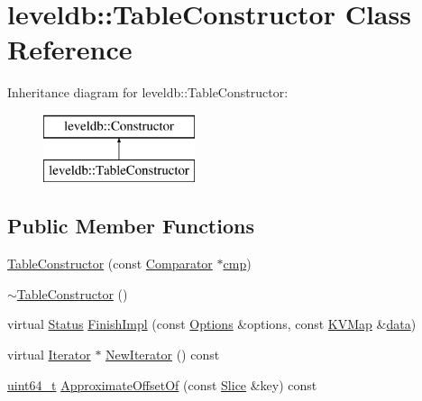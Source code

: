 \hypertarget{classleveldb_1_1_table_constructor}{}\section{leveldb\+:\+:Table\+Constructor Class Reference}
\label{classleveldb_1_1_table_constructor}
Inheritance diagram for leveldb\+:\+:Table\+Constructor\+:\begin{figure}[H]
\begin{center}
\leavevmode
\includegraphics[height=2.000000cm]{classleveldb_1_1_table_constructor}
\end{center}
\end{figure}
\subsection*{Public Member Functions}
\begin{DoxyCompactItemize}
\item 
\hyperlink{classleveldb_1_1_table_constructor_acfc791dc15a8fac77f9715fda659eb19}{Table\+Constructor} (const \hyperlink{structleveldb_1_1_comparator}{Comparator} $\ast$\hyperlink{table__test_8cc_a87863e435922f0910ca8db43f02a6c0b}{cmp})
\item 
\hyperlink{classleveldb_1_1_table_constructor_a4be60433281b7d5e6aa37688be8d1631}{$\sim$\+Table\+Constructor} ()
\item 
virtual \hyperlink{classleveldb_1_1_status}{Status} \hyperlink{classleveldb_1_1_table_constructor_aa8ce3799a55859c2dee50d3e08f56ef2}{Finish\+Impl} (const \hyperlink{structleveldb_1_1_options}{Options} \&options, const \hyperlink{namespaceleveldb_aac1e50450147be263e08252c6700f7a7}{K\+V\+Map} \&\hyperlink{classleveldb_1_1_constructor_a55a0363200d6e86d8beb3b15b75e3824}{data})
\item 
virtual \hyperlink{classleveldb_1_1_iterator}{Iterator} $\ast$ \hyperlink{classleveldb_1_1_table_constructor_a4897f3cb58fed2bd3a9f7f6468b6a105}{New\+Iterator} () const 
\item 
\hyperlink{stdint_8h_aaa5d1cd013383c889537491c3cfd9aad}{uint64\+\_\+t} \hyperlink{classleveldb_1_1_table_constructor_a798ee199e8fdc5ec020725dba32a4cb6}{Approximate\+Offset\+Of} (const \hyperlink{classleveldb_1_1_slice}{Slice} \&key) const 
\end{DoxyCompactItemize}


